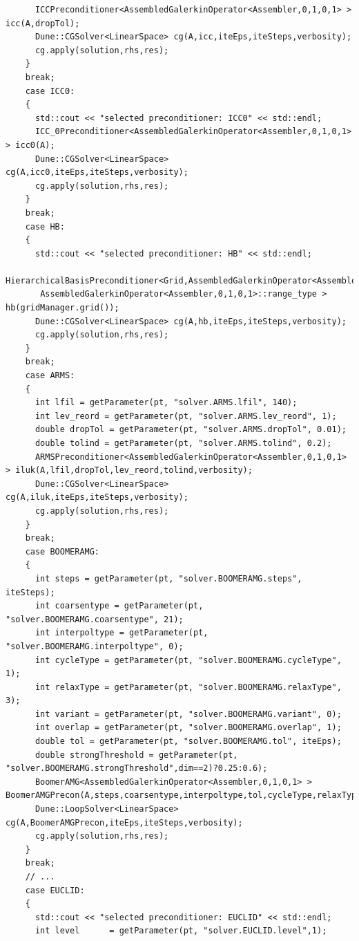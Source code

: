 \documentclass[11pt]{article}
\begin{document}
\begin{lstlisting}
      ICCPreconditioner<AssembledGalerkinOperator<Assembler,0,1,0,1> > icc(A,dropTol);
      Dune::CGSolver<LinearSpace> cg(A,icc,iteEps,iteSteps,verbosity);
      cg.apply(solution,rhs,res);
    }
    break;
    case ICC0:
    {
      std::cout << "selected preconditioner: ICC0" << std::endl;
      ICC_0Preconditioner<AssembledGalerkinOperator<Assembler,0,1,0,1> > icc0(A);
      Dune::CGSolver<LinearSpace> cg(A,icc0,iteEps,iteSteps,verbosity);
      cg.apply(solution,rhs,res);
    }
    break;
    case HB:
    {
      std::cout << "selected preconditioner: HB" << std::endl;
      HierarchicalBasisPreconditioner<Grid,AssembledGalerkinOperator<Assembler,0,1,0,1>::range_type,
       AssembledGalerkinOperator<Assembler,0,1,0,1>::range_type > hb(gridManager.grid());
      Dune::CGSolver<LinearSpace> cg(A,hb,iteEps,iteSteps,verbosity);
      cg.apply(solution,rhs,res);
    }
    break;
    case ARMS:
    {
      int lfil = getParameter(pt, "solver.ARMS.lfil", 140);
      int lev_reord = getParameter(pt, "solver.ARMS.lev_reord", 1);
      double dropTol = getParameter(pt, "solver.ARMS.dropTol", 0.01);
      double tolind = getParameter(pt, "solver.ARMS.tolind", 0.2);
      ARMSPreconditioner<AssembledGalerkinOperator<Assembler,0,1,0,1> > iluk(A,lfil,dropTol,lev_reord,tolind,verbosity);
      Dune::CGSolver<LinearSpace> cg(A,iluk,iteEps,iteSteps,verbosity);
      cg.apply(solution,rhs,res);
    }
    break;
    case BOOMERAMG:
    {
      int steps = getParameter(pt, "solver.BOOMERAMG.steps", iteSteps);
      int coarsentype = getParameter(pt, "solver.BOOMERAMG.coarsentype", 21);
      int interpoltype = getParameter(pt, "solver.BOOMERAMG.interpoltype", 0);
      int cycleType = getParameter(pt, "solver.BOOMERAMG.cycleType", 1);
      int relaxType = getParameter(pt, "solver.BOOMERAMG.relaxType", 3);
      int variant = getParameter(pt, "solver.BOOMERAMG.variant", 0);
      int overlap = getParameter(pt, "solver.BOOMERAMG.overlap", 1);
      double tol = getParameter(pt, "solver.BOOMERAMG.tol", iteEps);
      double strongThreshold = getParameter(pt, "solver.BOOMERAMG.strongThreshold",dim==2)?0.25:0.6);
      BoomerAMG<AssembledGalerkinOperator<Assembler,0,1,0,1> > BoomerAMGPrecon(A,steps,coarsentype,interpoltype,tol,cycleType,relaxType,strongThreshold,variant,overlap,1,verbosity);
      Dune::LoopSolver<LinearSpace> cg(A,BoomerAMGPrecon,iteEps,iteSteps,verbosity);
      cg.apply(solution,rhs,res);
    }
    break;
    // ... 
    case EUCLID:
    {
      std::cout << "selected preconditioner: EUCLID" << std::endl;
      int level      = getParameter(pt, "solver.EUCLID.level",1);

\end{lstlisting}
\end{document}
